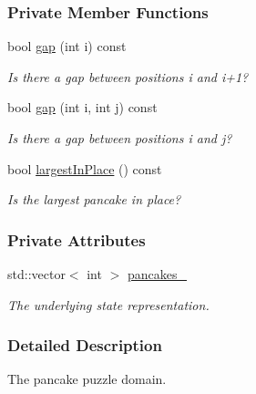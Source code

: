 \subsubsection*{Private Member Functions}
\begin{DoxyCompactItemize}
\item 
bool \hyperlink{structdomain_1_1pancake_1_1Pancake_a122870b530e74c655a156bb6f513712b}{gap} (int i) const 
\begin{DoxyCompactList}\small\item\em Is there a gap between positions i and i+1? \end{DoxyCompactList}\item 
bool \hyperlink{structdomain_1_1pancake_1_1Pancake_a30fb4f2b3b8bccf01898b6d18a3ab39a}{gap} (int i, int j) const 
\begin{DoxyCompactList}\small\item\em Is there a gap between positions i and j? \end{DoxyCompactList}\item 
bool \hyperlink{structdomain_1_1pancake_1_1Pancake_af5b67e9da581228aa246ff02814dbc4c}{largest\+In\+Place} () const 
\begin{DoxyCompactList}\small\item\em Is the largest pancake in place? \end{DoxyCompactList}\end{DoxyCompactItemize}
\subsubsection*{Private Attributes}
\begin{DoxyCompactItemize}
\item 
std\+::vector$<$ int $>$ \hyperlink{structdomain_1_1pancake_1_1Pancake_aef6a3a8c658afe603446e180c966b62f}{pancakes\+\_\+}\hypertarget{structdomain_1_1pancake_1_1Pancake_aef6a3a8c658afe603446e180c966b62f}{}\label{structdomain_1_1pancake_1_1Pancake_aef6a3a8c658afe603446e180c966b62f}

\begin{DoxyCompactList}\small\item\em The underlying state representation. \end{DoxyCompactList}\end{DoxyCompactItemize}


\subsubsection{Detailed Description}
The pancake puzzle domain. 

